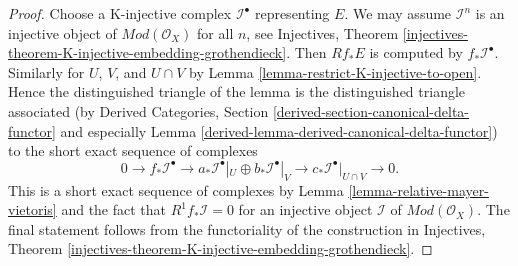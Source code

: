 \documentclass[10pt,a4paper]{amsart}
\theoremstyle{plain}
\theoremstyle{definition}
\theoremstyle{remark}
\numberwithin{equation}{subsection}
\begin{document}
\begin{proof}
Choose a K-injective complex $\mathcal{I}^\bullet$
representing $E$. We may assume $\mathcal{I}^n$ is an injective
object of $\textit{Mod}(\mathcal{O}_X)$ for all $n$, see
Injectives, Theorem
\ref{injectives-theorem-K-injective-embedding-grothendieck}.
Then $Rf_*E$ is computed by $f_*\mathcal{I}^\bullet$.
Similarly for $U$, $V$, and $U \cap V$ by
Lemma \ref{lemma-restrict-K-injective-to-open}.
Hence the distinguished triangle of the lemma is the distinguished
triangle associated (by
Derived Categories, Section
\ref{derived-section-canonical-delta-functor} and especially
Lemma \ref{derived-lemma-derived-canonical-delta-functor})
to the short exact sequence of complexes
$$
0 \to
f_*\mathcal{I}^\bullet \to
a_*\mathcal{I}^\bullet|_U \oplus b_*\mathcal{I}^\bullet|_V \to
c_*\mathcal{I}^\bullet|_{U \cap V} \to
0.
$$
This is a short exact sequence of complexes by
Lemma \ref{lemma-relative-mayer-vietoris}
and the fact that $R^1f_*\mathcal{I} = 0$
for an injective object $\mathcal{I}$ of $\textit{Mod}(\mathcal{O}_X)$.
The final statement follows from the functoriality of the construction
in Injectives, Theorem
\ref{injectives-theorem-K-injective-embedding-grothendieck}.
\end{proof}
\end{document}
